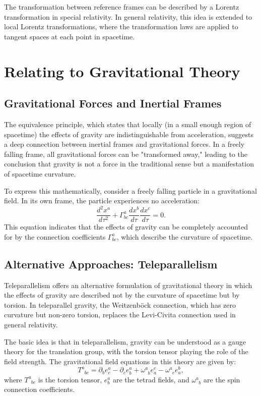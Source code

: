 \documentclass[12pt]{article}
\begin{document}
The transformation between reference frames can be described by a Lorentz transformation in special relativity. In general relativity, this idea is extended to local Lorentz transformations, where the transformation laws are applied to tangent spaces at each point in spacetime.

\section{Relating to Gravitational Theory}
\subsection{Gravitational Forces and Inertial Frames}
The equivalence principle, which states that locally (in a small enough region of spacetime) the effects of gravity are indistinguishable from acceleration, suggests a deep connection between inertial frames and gravitational forces. In a freely falling frame, all gravitational forces can be "transformed away," leading to the conclusion that gravity is not a force in the traditional sense but a manifestation of spacetime curvature.

To express this mathematically, consider a freely falling particle in a gravitational field. In its own frame, the particle experiences no acceleration:
\begin{equation}
\frac{d^2 x^a}{d\tau^2} + \Gamma^a_{bc} \frac{dx^b}{d\tau} \frac{dx^c}{d\tau} = 0.
\end{equation}
This equation indicates that the effects of gravity can be completely accounted for by the connection coefficients \( \Gamma^a_{bc} \), which describe the curvature of spacetime.

\subsection{Alternative Approaches: Teleparallelism}
Teleparallelism offers an alternative formulation of gravitational theory in which the effects of gravity are described not by the curvature of spacetime but by torsion. In teleparallel gravity, the Weitzenböck connection, which has zero curvature but non-zero torsion, replaces the Levi-Civita connection used in general relativity.

The basic idea is that in teleparallelism, gravity can be understood as a gauge theory for the translation group, with the torsion tensor playing the role of the field strength. The gravitational field equations in this theory are given by:
\begin{equation}
T^a_{\phantom{a}bc} = \partial_b e^a_c - \partial_c e^a_b + \omega^a_{\phantom{a}b} e^c_a - \omega^a_{\phantom{a}c} e^b_a,
\end{equation}
where \( T^a_{\phantom{a}bc} \) is the torsion tensor, \( e^a_b \) are the tetrad fields, and \( \omega^a_{\phantom{a}b} \) are the spin connection coefficients.
\end{document}
